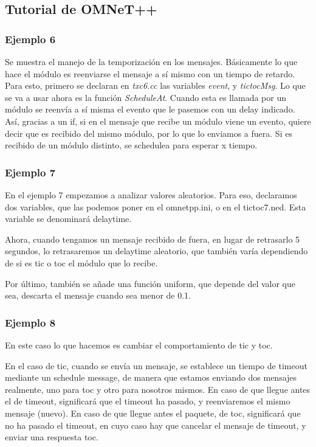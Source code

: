 \documentclass{article}
\begin{document}
	\subsection{Tutorial de OMNeT++}
	
		\subsubsection{Ejemplo 6}
		
		Se muestra el manejo de la temporización en los mensajes. Básicamente lo que hace el módulo es reenviarse el mensaje a sí mismo con un tiempo de retardo. Para esto, primero se declaran en \textit{txc6.cc} las variables \textit{event}, y \textit{tictocMsg}. Lo que se va a usar ahora es la función \textit{ScheduleAt}. Cuando esta es llamada por un módulo se reenvía a sí misma el evento que le pasemos con un delay indicado. Así, gracias a un if, si en el mensaje que recibe un módulo viene un evento, quiere decir que es recibido del mismo módulo, por lo que lo enviamos a fuera. Si es recibido de un módulo distinto, se schedulea para esperar x tiempo.
		
		\subsubsection{Ejemplo 7}
		
		En el ejemplo 7 empezamos a analizar valores aleatorios. Para eso, declaramos dos variables, que las podemos poner en el omnetpp.ini, o en el tictoc7.ned. Esta variable se denominará delaytime.
		
		Ahora, cuando tengamos un mensaje recibido de fuera, en lugar de retrasarlo 5 segundos, lo retrasaremos un delaytime aleatorio, que también varía dependiendo de si es tic o toc el módulo que lo recibe.
		
		Por último, también se añade una función uniform, que depende del valor que sea, descarta el mensaje cuando sea menor de 0.1.
		
		\subsubsection{Ejemplo 8}
		
		En este caso lo que hacemos es cambiar el comportamiento de tic y toc. 

		En el caso de tic, cuando se envía un mensaje, se establece un tiempo de timeout mediante un schedule message, de manera que estamos enviando dos mensajes realmente, uno para toc y otro para nosotros mismos. En caso de que llegue antes el de timeout, significará que el timeout ha pasado, y reenviaremos el mismo mensaje (nuevo). En caso de que llegue antes el paquete, de toc, significará que no ha pasado el timeout, en cuyo caso hay que cancelar el mensaje de timeout, y enviar una respuesta  toc.
		
\end{document}
